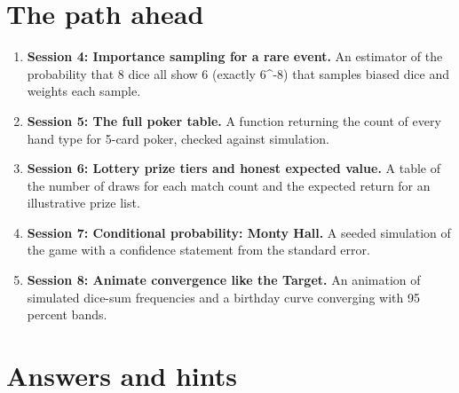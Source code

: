 \documentclass[11pt,a4paper]{article}
\begin{document}
\section{The path ahead}
\begin{enumerate}[nosep]
\item \textbf{Session 4: Importance sampling for a rare event.} An estimator of the probability that 8 dice all show 6 (exactly 6\textasciicircum{}-8) that samples biased dice and weights each sample.
\item \textbf{Session 5: The full poker table.} A function returning the count of every hand type for 5-card poker, checked against simulation.
\item \textbf{Session 6: Lottery prize tiers and honest expected value.} A table of the number of draws for each match count and the expected return for an illustrative prize list.
\item \textbf{Session 7: Conditional probability: Monty Hall.} A seeded simulation of the game with a confidence statement from the standard error.
\item \textbf{Session 8: Animate convergence like the Target.} An animation of simulated dice-sum frequencies and a birthday curve converging with 95 percent bands.
\end{enumerate}

\section{Answers and hints}
\end{document}
